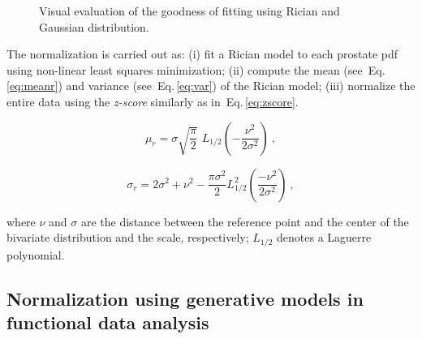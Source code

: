 \begin{figure}
  \centering
  \hfill
  \hfill
  \caption{Visual evaluation of the goodness of fitting using Rician and Gaussian distribution.}
  \label{fig:fitting}
\end{figure}

The normalization is carried out as: 
(i) fit a Rician model to each prostate \ac{pdf} using non-linear least squares minimization; 
(ii) compute the mean (see~Eq.\,\eqref{eq:meanr}) and variance (see~Eq.\,\eqref{eq:var}) of the Rician model;
(iii) normalize the entire data using the \textit{z-score} similarly as in~Eq.\,\eqref{eq:zscore}.

\begin{equation}
  \mu_{r} = \sigma  \sqrt{\frac{\pi}{2}}\,\,L_{1/2}(-\frac{\nu^2}{2\sigma^2})  \ ,
  \label{eq:meanr}
\end{equation}

\begin{equation}
  \sigma_{r} = 2\sigma^2+\nu^2-\frac{\pi\sigma^2}{2}L_{1/2}^2\left(\frac{-\nu^2}{2\sigma^2}\right)  \ ,
  \label{eq:var}
\end{equation}

\noindent where $\nu$ and $\sigma$ are the distance between the reference point and the center of the bivariate distribution and the scale, respectively; $L_{1/2}$ denotes a Laguerre polynomial.

\subsection{Normalization using generative models in functional data analysis}

